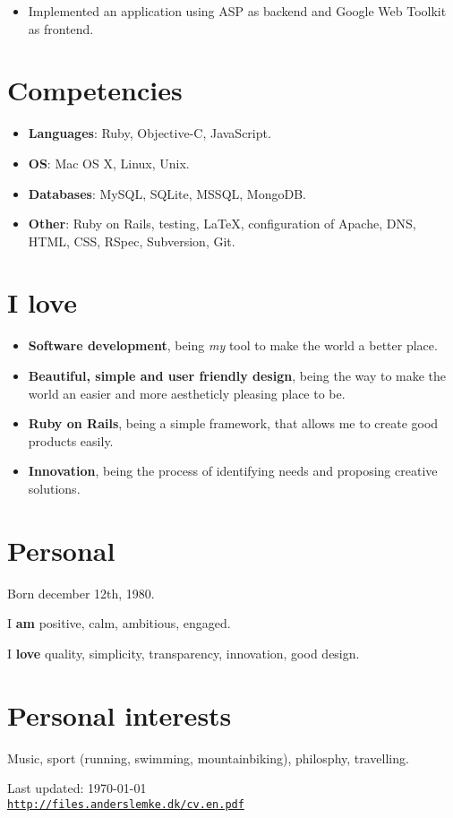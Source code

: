 \documentclass[a4paper]{article}
\begin{document}
\begin{itemize}
	\item Implemented an application using ASP as backend and Google Web Toolkit as frontend.
\end{itemize}

\section*{Competencies}

\begin{itemize}
\item \textbf{Languages}: Ruby, Objective-C, JavaScript.
\item \textbf{OS}: Mac OS X, Linux, Unix.
\item \textbf{Databases}: MySQL, SQLite, MSSQL, MongoDB.
\item \textbf{Other}: Ruby on Rails, testing, \LaTeX, configuration of Apache, DNS, HTML, CSS, RSpec, Subversion, Git.
\end{itemize}


\section*{I love}

\begin{itemize}
  \item \textbf{Software development}, being \emph{my} tool to make the world a better place.
  \item \textbf{Beautiful, simple and user friendly design}, being the way to make the world an easier and more aestheticly  pleasing place to be.
  \item \textbf{Ruby on Rails}, being a simple framework, that allows me to create good products easily.
  \item \textbf{Innovation}, being the process of identifying needs and proposing creative solutions.
\end{itemize}


\section*{Personal}
Born december 12th, 1980.

I \textbf{am} positive, calm, ambitious, engaged.

I \textbf{love} quality, simplicity, transparency, innovation, good design.

\section*{Personal interests} 

Music, sport (running, swimming, mountainbiking), philosphy, travelling.


\bigskip

\begin{center}
\begin{footnotesize}
Last updated: \today \\
\href{http://files.anderslemke.dk/cv.en.pdf}{\tt http://files.anderslemke.dk/cv.en.pdf}
\end{footnotesize}
\end{center}
\end{document}
